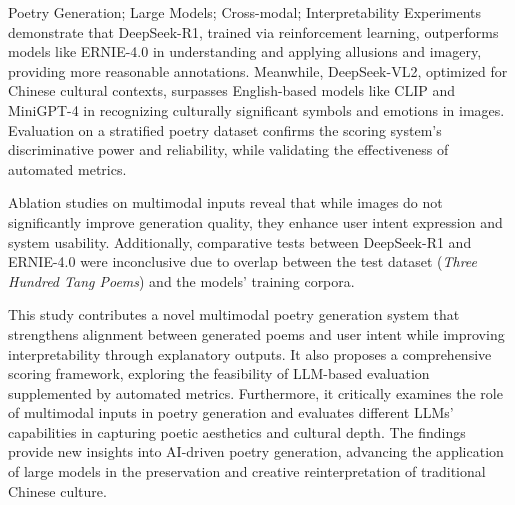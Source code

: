 \begin{enabstract}{Poetry Generation; Large Models; Cross-modal; Interpretability}
Experiments demonstrate that DeepSeek-R1, trained via reinforcement learning, outperforms models like ERNIE-4.0 in understanding and applying allusions and imagery, providing more reasonable annotations. Meanwhile, DeepSeek-VL2, optimized for Chinese cultural contexts, surpasses English-based models like CLIP and MiniGPT-4 in recognizing culturally significant symbols and emotions in images. Evaluation on a stratified poetry dataset confirms the scoring system's discriminative power and reliability, while validating the effectiveness of automated metrics.  

Ablation studies on multimodal inputs reveal that while images do not significantly improve generation quality, they enhance user intent expression and system usability. Additionally, comparative tests between DeepSeek-R1 and ERNIE-4.0 were inconclusive due to overlap between the test dataset (\textit{Three Hundred Tang Poems}) and the models' training corpora.  

This study contributes a novel multimodal poetry generation system that strengthens alignment between generated poems and user intent while improving interpretability through explanatory outputs. It also proposes a comprehensive scoring framework, exploring the feasibility of LLM-based evaluation supplemented by automated metrics. Furthermore, it critically examines the role of multimodal inputs in poetry generation and evaluates different LLMs' capabilities in capturing poetic aesthetics and cultural depth. The findings provide new insights into AI-driven poetry generation, advancing the application of large models in the preservation and creative reinterpretation of traditional Chinese culture.  
  


\end{enabstract}
